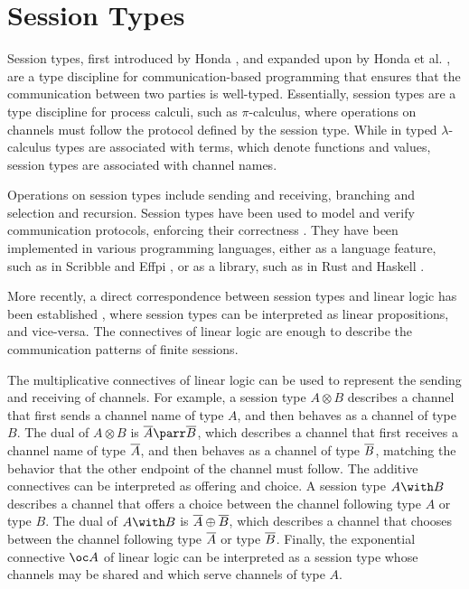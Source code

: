 \section{Session Types}

Session types, first introduced by Honda \cite{Honda:1993}, and expanded upon by Honda et al. \cite{Honda:1998}, are a type discipline for communication-based programming that ensures that the communication between two parties is well-typed. Essentially, session types are a type discipline for process calculi, such as $\pi$-calculus, where operations on channels must follow the protocol defined by the session type. While in typed $\lambda$-calculus types are associated with terms, which denote functions and values, session types are associated with channel names.

Operations on session types include sending and receiving, branching and selection and recursion. Session types have been used to model and verify communication protocols, enforcing their correctness \cite{Huttel:2016}. They have been implemented in various programming languages, either as a language feature, such as in Scribble \cite{Yoshida:2014} and Effpi \cite{Scalas:2019}, or as a library, such as in Rust \cite{Jespersen:2015} and Haskell \cite{Pucella:2008}.

More recently, a direct correspondence between session types and linear logic has been established \cite{Caires:2010, Wadler:2012, Caires:2012, Caires:2016, Giunti:2016}, where session types can be interpreted as linear propositions, and vice-versa. The connectives of linear logic are enough to describe the communication patterns of finite sessions.

The multiplicative connectives of linear logic can be used to represent the sending and receiving of channels. For example, a session type $A \otimes B$ describes a channel that first sends a channel name of type $A$, and then behaves as a channel of type $B$. The dual of $A \otimes B$ is $\dual{A} \parr \dual{B}$, which describes a channel that first receives a channel name of type $\overline{A}$, and then behaves as a channel of type $\overline{B}$, matching the behavior that the other endpoint of the channel must follow. The additive connectives can be interpreted as offering and choice. A session type $A \with B$ describes a channel that offers a choice between the channel following type $A$ or type $B$. The dual of $A \with B$ is $\overline{A} \oplus \overline{B}$, which describes a channel that chooses between the channel following type $\overline{A}$ or type $\overline{B}$. Finally, the exponential connective $\oc A$ of linear logic can be interpreted as a session type whose channels may be shared and which serve channels of type $A$.

